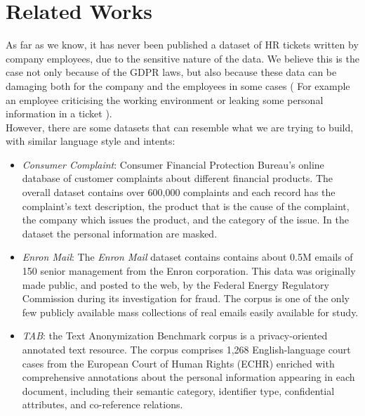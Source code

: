 \chapter{Related Works}
\label{sec:RelatedWorks}

As far as we know, it has never been published a dataset of HR tickets written by company employees, due to the sensitive nature of the data. We believe this is the case not only because of the GDPR laws, but also because these data can be damaging both for the company and the employees in some cases ( For example an employee criticising the working environment or leaking some personal information in a ticket ).  \\
However, there are some datasets that can resemble what we are trying to build, with similar language style and intents:
\begin{itemize}
    \item \textit{Consumer Complaint}: Consumer Financial Protection Bureau's online database of customer complaints about different financial products. The overall dataset contains over 600,000 complaints and each record has the complaint's text description, the product that is the cause of the complaint, the company which issues the product, and the category of the issue. In the dataset the personal information are masked.
    \item \textit{Enron Mail}: The \textit{Enron Mail} dataset contains contains about 0.5M emails of 150 senior management from the Enron corporation. This data was originally made public, and posted to the web, by the Federal Energy Regulatory Commission during its investigation for fraud. The corpus is one of the only few publicly available mass collections of real emails easily available for study.
    \item \textit{TAB}: the Text Anonymization Benchmark corpus\cite{pilan2022text} is a privacy-oriented annotated text resource. The corpus comprises 1,268 English-language court cases from the European Court of Human Rights (ECHR) enriched with comprehensive annotations about the personal information appearing in each document, including their semantic category, identifier type, confidential
    attributes, and co-reference relations.
\end{itemize}
